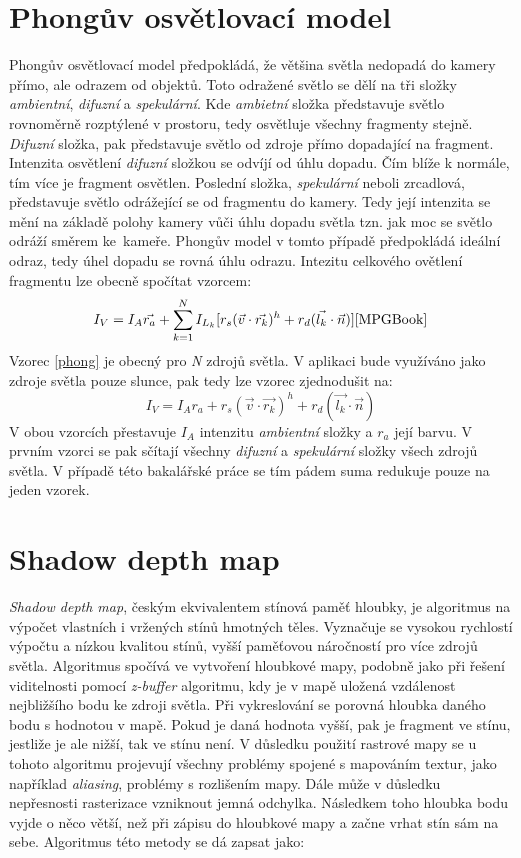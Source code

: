 \section{Phongův osvětlovací model}
Phongův osvětlovací model předpokládá, že většina světla nedopadá do kamery přímo, ale odrazem od objektů.
Toto odražené světlo se dělí na tři složky \emph{ambientní}, \emph{difuzní} a \emph{spekulární}. Kde \emph{ambietní} složka představuje světlo rovnoměrně rozptýlené v prostoru, tedy osvětluje všechny fragmenty stejně. \emph{Difuzní} složka, pak představuje světlo od zdroje  přímo dopadající na fragment. Intenzita osvětlení \emph{difuzní} složkou se odvíjí od úhlu dopadu. Čím blíže k normále, tím více je fragment osvětlen. Poslední složka, \emph{spekulární} neboli zrcadlová, představuje světlo odrážející se od fragmentu do kamery. Tedy její intenzita se mění na základě polohy kamery vůči úhlu dopadu světla tzn. jak moc se světlo odráží směrem ke~kameře. Phongův model v tomto případě předpokládá ideální odraz, tedy úhel dopadu se rovná  úhlu odrazu. Intezitu celkového ovětlení fragmentu lze obecně spočítat vzorcem:
\begin{equation}\label{phong}
I_V = I_A \vec{r_a} + \sum_{k=1}^{N}I_{L_k}[r_s(\vec{v}\cdot\vec{r_k})^h + r_d(\vec{l_k}\cdot\vec{n})]\cite{MPGBook}
\end{equation}
Vzorec \ref{phong} je obecný pro \emph{N} zdrojů světla. V aplikaci bude využíváno jako zdroje světla pouze slunce, pak tedy lze vzorec zjednodušit na:
\begin{equation}\label{MyPhong}
I_V = I_A r_a + r_s(\vec{v}\cdot\vec{r_k})^h + r_d(\vec{l_k}\cdot\vec{n})
\end{equation}
 V obou vzorcích přestavuje $ I_A $ intenzitu \emph{ambientní} složky a $r_a$ její barvu. V prvním vzorci se pak sčítají všechny \emph{difuzní} a \emph{spekulární} složky všech zdrojů světla. V případě této bakalářské práce se tím pádem suma redukuje pouze na jeden vzorek.

\section{Shadow depth map}\label{shadowMap}
\emph{Shadow depth map}, českým ekvivalentem stínová paměť hloubky\cite{MPGBook}, je algoritmus na výpočet vlastních i vržených stínů hmotných těles. Vyznačuje se vysokou rychlostí výpočtu a nízkou kvalitou stínů, vyšší paměťovou náročností pro více zdrojů světla. Algoritmus spočívá ve vytvoření hloubkové mapy, podobně jako při řešení viditelnosti pomocí \emph{z-buffer} algoritmu, kdy je v mapě uložená vzdálenost nejbližšího bodu ke zdroji světla. Při vykreslování se porovná hloubka daného bodu s hodnotou v mapě. Pokud je daná hodnota vyšší, pak je fragment ve stínu, jestliže je ale nižší, tak ve stínu není. V důsledku použití rastrové mapy se u tohoto algoritmu projevují všechny problémy spojené s mapováním textur, jako například \emph{aliasing}, problémy s rozlišením mapy. Dále může v důsledku nepřesnosti rasterizace vzniknout jemná odchylka. Následkem toho hloubka bodu vyjde o něco větší, než při zápisu do hloubkové mapy a začne vrhat stín sám na sebe. Algoritmus této metody se dá zapsat jako: 
\\
\\ 

